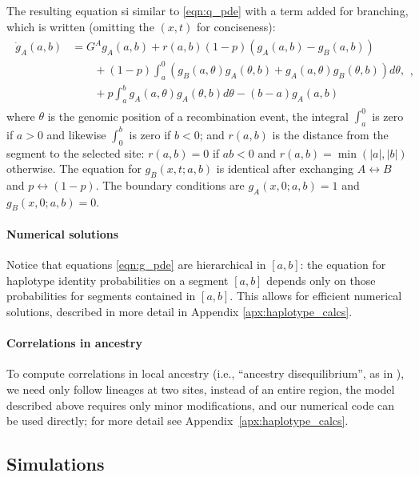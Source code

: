 \documentclass[11pt,letterpaper]{article}
\begin{document}
The resulting equation si similar to \eqref{eqn:q_pde} with a term added for branching,
which is written (omitting the $(x,t)$ for conciseness):
\begin{align}
    \begin{aligned} \label{eqn:g_pde}
        \dot g_A(a,b) 
        &= G^A g_A(a,b) + r(a,b) (1-p) (g_A(a,b)-g_B(a,b))
            \\ {} & \qquad 
            + (1-p) \int_a^0 \left(
                g_B(a,\theta) g_A(\theta,b)
                + g_A(a,\theta) g_B(\theta,b)
            \right) d\theta,
            \\ {} & \qquad 
            + p \int_a^b {
                g_A(a,\theta) g_A(\theta,b) 
            } d\theta
            - (b-a) g_A(a,b)  
    \end{aligned} ,
\end{align}
where $\theta$ is the genomic position of a recombination event, 
the integral $\int_a^0$ is zero if $a>0$ and likewise $\int_0^b$ is zero if $b<0$;
and $r(a,b)$ is the distance from the segment to the selected site:
$r(a,b)=0$ if $ab<0$ and $r(a,b)=\min(|a|,|b|)$ otherwise.
The equation for $g_B(x,t;a,b)$ is identical after exchanging $A \leftrightarrow B$ and
$p \leftrightarrow (1-p)$.
The boundary conditions are $g_A(x,0;a,b)=1$ and $g_B(x,0;a,b)=0$.

\paragraph{Numerical solutions}
Notice that equations \eqref{eqn:g_pde}
are hierarchical in $[a,b]$:
the equation for haplotype identity probabilities on a segment $[a,b]$ depends only on those probabilities for segments contained in $[a,b]$.
This allows for efficient numerical solutions,
described in more detail in Appendix \ref{apx:haplotype_calcs}.


\paragraph{Correlations in ancestry}
To compute correlations in local ancestry
(i.e., ``ancestry disequilibrium'', as in \citet{Pool2015,Schumer2016}),
we need only follow lineages at two sites, instead of an entire region,
the model described above requires only minor modifications,
and our numerical code can be used directly;
for more detail see Appendix~\ref{apx:haplotype_calcs}.


\subsection*{Simulations}
\end{document}

